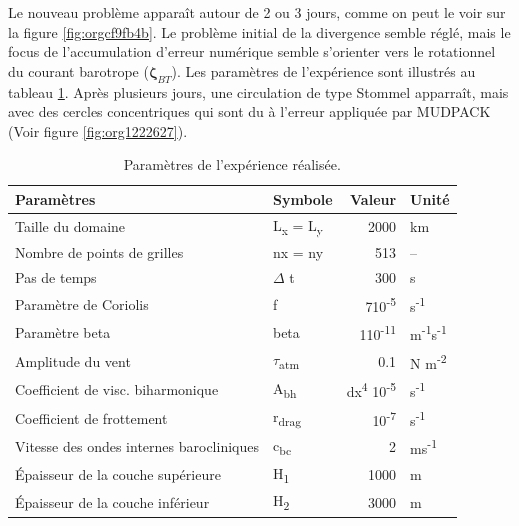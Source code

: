 \documentclass[10pt]{article}
\numberwithin{equation}{section}
\begin{document}
Le nouveau problème apparaît autour de 2 ou 3 jours, comme on peut le voir sur la figure \ref{fig:orgcf9fb4b}.
Le problème initial de la divergence semble réglé, mais le focus de l'accumulation d'erreur numérique semble s'orienter vers le rotationnel du courant barotrope (\(\boldsymbol{\zeta}_{BT}\)).
Les paramètres de l'expérience sont illustrés au tableau \ref{tab:orgcf4c200}.
Après plusieurs jours, une circulation de type Stommel apparraît, mais avec des cercles concentriques qui sont du à l'erreur appliquée par MUDPACK (Voir figure \ref{fig:org1222627}).

\begin{table}[htbp]
\caption{\label{tab:orgcf4c200}Paramètres de l'expérience réalisée.}
\centering
\begin{tabular}{llrl}
\hline
\hline
Paramètres & Symbole & Valeur & Unité\\[0pt]
\hline
Taille du domaine & L\textsubscript{x} = L\textsubscript{y} & 2000 & km\\[0pt]
Nombre de points de grilles & nx = ny & 513 & --\\[0pt]
Pas de temps & \(\Delta\) t & 300 & s\\[0pt]
Paramètre de Coriolis & f & 7\texttimes{}10\textsuperscript{-5} & s\textsuperscript{-1}\\[0pt]
Paramètre beta & beta & 1\texttimes{}10\textsuperscript{-11} & m\textsuperscript{-1}s\textsuperscript{-1}\\[0pt]
Amplitude du vent & \(\tau\)\textsubscript{atm} & 0.1 & N m\textsuperscript{-2}\\[0pt]
Coefficient de visc. biharmonique & A\textsubscript{bh} & dx\textsuperscript{4} \texttimes{}10\textsuperscript{-5} & s\textsuperscript{-1}\\[0pt]
Coefficient de frottement & r\textsubscript{drag} & 10\textsuperscript{-7} & s\textsuperscript{-1}\\[0pt]
Vitesse des ondes internes barocliniques & c\textsubscript{bc} & 2 & ms\textsuperscript{-1}\\[0pt]
Épaisseur de la couche supérieure & H\textsubscript{1} & 1000 & m\\[0pt]
Épaisseur de la couche inférieur & H\textsubscript{2} & 3000 & m\\[0pt]
\hline
\end{tabular}
\end{table}
\end{document}
